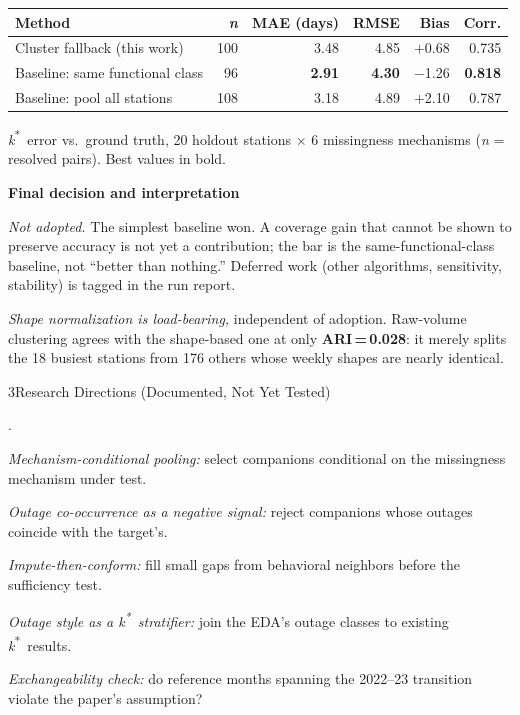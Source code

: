 \documentclass[10pt]{article}
\newcommand{\sectionhead}[1]{%
  \par\vspace{8pt}%
  {\headfont\fontsize{12.5}{15}\selectfont\color{navy}#1\par}%
  \vspace{2.5pt}{\color{rulegray}\hrule height 0.6pt}\vspace{4pt}}
\newcommand{\subhead}[1]{%
  \par\vspace{4.5pt}%
  {\labelfont\bfseries\fontsize{10}{12}\selectfont\color{navy}#1\par}\vspace{1.5pt}}
\newlength{\itemgap}\setlength{\itemgap}{1.5pt}
\newenvironment{points}{\begin{list}{\textcolor{navy}{\small\textbullet}}{%
  \setlength{\leftmargin}{1.05em}\setlength{\labelwidth}{0.7em}%
  \setlength{\labelsep}{0.4em}\setlength{\itemsep}{\itemgap}%
  \setlength{\parsep}{0pt}\setlength{\topsep}{1pt}\setlength{\partopsep}{0pt}}}%
  {\end{list}}
\newenvironment{numbered}{\begin{list}{\labelfont\color{navy}\arabic{enumi}.}{\usecounter{enumi}%
  \setlength{\leftmargin}{1.25em}\setlength{\labelwidth}{0.9em}%
  \setlength{\labelsep}{0.4em}\setlength{\itemsep}{\itemgap}%
  \setlength{\parsep}{0pt}\setlength{\topsep}{1pt}\setlength{\partopsep}{0pt}}}%
  {\end{list}}
\newcommand{\kstar}{\textit{k}\textsuperscript{*}}
\newcommand{\num}[1]{\textbf{#1}}
\begin{document}
\vspace{9pt}
{\centering\fontsize{9.5}{11.5}\selectfont
\setlength{\tabcolsep}{8pt}
\begin{tabular}{@{}lrrrrr@{}}
\toprule
{\bfseries Method} & {\bfseries \textit{n}} & {\bfseries MAE (days)} &
  {\bfseries RMSE} & {\bfseries Bias} & {\bfseries Corr.}\\
\midrule
Cluster fallback (this work)      & 100 & 3.48 & 4.85 & $+$0.68 & 0.735\\
Baseline: same functional class   &  96 & \textbf{2.91} & \textbf{4.30} & $-$1.26 & \textbf{0.818}\\
Baseline: pool all stations       & 108 & 3.18 & 4.89 & $+$2.10 & 0.787\\
\bottomrule
\end{tabular}\par\vspace{2.5pt}
{\metafont\fontsize{8.25}{10}\selectfont\color{slate}%
\kstar\ error vs.\ ground truth, 20 holdout stations $\times$ 6 missingness mechanisms
(\textit{n} = resolved pairs). Best values in bold.}\par}
\vspace{4pt}

\subhead{Final decision and interpretation}
\begin{points}
  \item \textit{Not adopted.} The simplest baseline won. A coverage gain that cannot be shown to
    preserve accuracy is not yet a contribution; the bar is the same-functional-class baseline, not
    ``better than nothing.'' Deferred work (other algorithms, sensitivity, stability) is tagged in the run
    report.
  \item \textit{Shape normalization is load-bearing,} independent of adoption. Raw-volume clustering
    agrees with the shape-based one at only \num{ARI\,=\,0.028}: it merely splits the 18 busiest
    stations from 176 others whose weekly shapes are nearly identical.
\end{points}

\sectionhead{3\quad Research Directions (Documented, Not Yet Tested)}
\begin{numbered}
  \item \textit{Mechanism-conditional pooling:} select companions conditional on the missingness
    mechanism under test.
  \item \textit{Outage co-occurrence as a negative signal:} reject companions whose outages coincide
    with the target's.
  \item \textit{Impute-then-conform:} fill small gaps from behavioral neighbors before the sufficiency test.
  \item \textit{Outage style as a \kstar\ stratifier:} join the EDA's outage classes to existing \kstar\
    results.
  \item \textit{Exchangeability check:} do reference months spanning the 2022--23 transition violate the
    paper's assumption?
\end{numbered}
\end{document}
